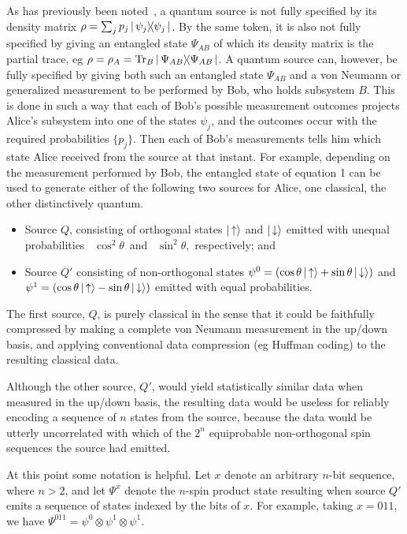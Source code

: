 As has previously been noted~\cite{Schu95,BBJMPSW94,JSV95}, a
quantum  source is not fully specified by its density matrix
$\rho = \sum_jp_j \left | \, \psi_j \right \rangle\!\!\left \langle \psi_j \, \right |$.  By the same token, it is also not
fully specified by giving an entangled state $\Psi_{AB}$ of which its
density matrix is the partial trace, eg
$\rho=\rho_A=\mbox{\rm Tr}_B\left | \, \Psi_{AB} \right \rangle\!\!\left \langle \Psi_{AB} \, \right |$.  A quantum source can, however, be
fully specified by giving both such an entangled state $\Psi_{AB}$ and a
von Neumann or generalized measurement to be performed by Bob, who holds
subsystem $B$.  This is done in such a way that each of Bob's possible
measurement outcomes projects Alice's subsystem into one of the states
$\psi_j$, and the outcomes occur with the required probabilities
$\{p_j\}$. Then each of Bob's measurements tells him which state Alice
received from the source at that instant.  For example, depending on the
measurement performed by Bob, the entangled state of equation 1 can be
used to generate either of the following two sources for Alice, one
classical, the other distinctively quantum.
 \begin{itemize}
\item Source $Q$, consisting of orthogonal states
$\left | \, \uparrow \right \rangle$ and
$\left | \, \downarrow \right \rangle$ emitted with unequal probabilities \,
$\cos^2\theta$\, and \, $\sin^2\theta$,\, respectively; and
\item Source $Q'$ consisting of non-orthogonal states
$\psi^0=(\cos\theta\left | \, \uparrow \right \rangle+\sin\theta\left | \, \downarrow \right \rangle)$
 and
$\psi^1=(\cos\theta\left | \, \uparrow \right \rangle-\sin\theta\left | \, \downarrow \right \rangle)$
emitted with equal probabilities.
\end{itemize}
 
The first source, $Q$, is purely classical in the sense that it could
be faithfully compressed by making a complete von Neumann
measurement in the up/down basis, and applying conventional data
compression (eg Huffman coding) to the resulting classical data.
 
Although the other source, $Q'$, would yield statistically
similar data when measured in the up/down basis, the resulting
data would be useless for reliably encoding a sequence of $n$
states from the source, because the data would
be utterly uncorrelated with which of the $2^n$ equiprobable
non-orthogonal spin sequences the source had emitted.
 
At this point some notation is helpful.  Let $x$ denote an arbitrary
$n$-bit sequence, where $n>2$, and let $\Psi^x$ denote the $n$-spin
product state resulting when source $Q'$ emits a sequence of states
indexed by the bits of $x$.  For example, taking $x=011$, we have
$\Psi^{011} = \psi^0 \otimes \psi^1 \otimes \psi^1$.
 
